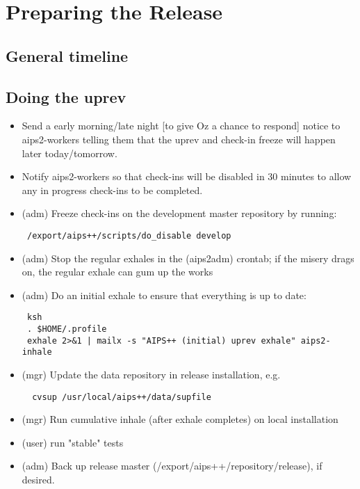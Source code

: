 \chapter{Preparing the Release}
\section{General timeline}
\section{Doing the uprev}
\begin{itemize}
\item Send a early morning/late night [to give Oz a chance to respond] notice
   to aips2-workers telling them that the uprev and check-in freeze will happen
      later today/tomorrow. 

\item Notify aips2-workers so that check-ins will be disabled in 30 minutes to
         allow any in progress check-ins to be completed.

\item (adm) Freeze check-ins on the development master repository by running:
\begin{verbatim}
 /export/aips++/scripts/do_disable develop
\end{verbatim}

\item (adm) Stop the regular exhales in the (aips2adm) crontab; if the misery
	drags on, the regular exhale can gum up the works

\item (adm) Do an initial exhale to ensure that everything is up to date:
\begin{verbatim}
 ksh
 . $HOME/.profile
 exhale 2>&1 | mailx -s "AIPS++ (initial) uprev exhale" aips2-inhale
\end{verbatim}

\item (mgr) Update the data repository in release installation, e.g.
\begin{verbatim}
  cvsup /usr/local/aips++/data/supfile
\end{verbatim}

\item (mgr) Run cumulative inhale (after exhale completes) on local installation
\item (user) run "stable" tests

\item (adm) Back up release master (/export/aips++/repository/release), if desired.


\end{itemize}
